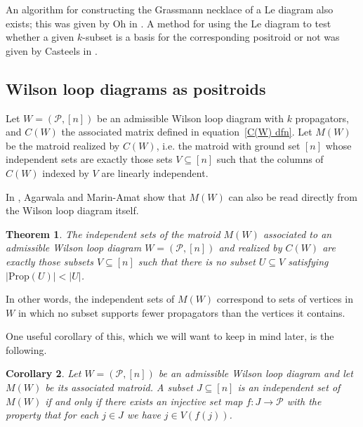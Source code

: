 \documentclass[11pt]{article}
\newcommand{\cP}{\mathcal{P}}
\newcommand{\Prop}{\textrm{Prop}}
\newtheorem{thm}{Theorem}[section]
\newtheorem{cor}[thm]{Corollary}
\theoremstyle{remark}
\theoremstyle{definition}
\begin{document}
An algorithm for constructing the Grassmann necklace of a Le diagram also exists; this was given by Oh in \cite[section 4]{Oh}. A method for using the Le diagram to test whether a given $k$-subset is a basis for the corresponding positroid or not was given by Casteels in \cite{CasteelsPaths}.



\subsection{Wilson loop diagrams as positroids}\label{sec:WLD as positroids}


Let $W = (\cP,[n])$ be an admissible Wilson loop diagram with $k$ propagators, and $C(W)$ the associated matrix defined in equation~\eqref{C(W) dfn}. Let $M(W)$ be the matroid realized by $C(W)$, i.e. the matroid with ground set $[n]$ whose independent sets are exactly those sets $V \subseteq [n]$ such that the columns of $C(W)$ indexed by $V$ are linearly independent.

In \cite{wilsonloop}, Agarwala and Marin-Amat show that $M(W)$ can also be read directly from the Wilson loop diagram itself.

\begin{thm} \label{thm WLD defines matroid} \cite[Theorem 3.6]{wilsonloop} The independent sets of the matroid $M(W)$ associated to an admissible Wilson loop diagram $W = (\cP,[n])$ and realized by $C(W)$ are exactly those subsets $V \subseteq [n]$ such that there is no subset $U \subseteq V$ satisfying $|\Prop(U)| < |U|$. \end{thm}
In other words, the independent sets of $M(W)$ correspond to sets of vertices in $W$ in which no subset supports fewer propagators than the vertices it contains.

One useful corollary of this, which we will want to keep in mind later, is the following.
\begin{cor}\label{lem basis as perm}
Let $W = (\cP,[n])$ be an admissible Wilson loop diagram and let $M(W)$ be its associated matroid. A subset $J \subseteq [n]$ is an independent set of $M(W)$ if and only if there exists an injective set map $f : J \rightarrow \cP$ with the property that for each $j\in J$ we have $j \in V(f(j))$.
\end{cor}
\end{document}
